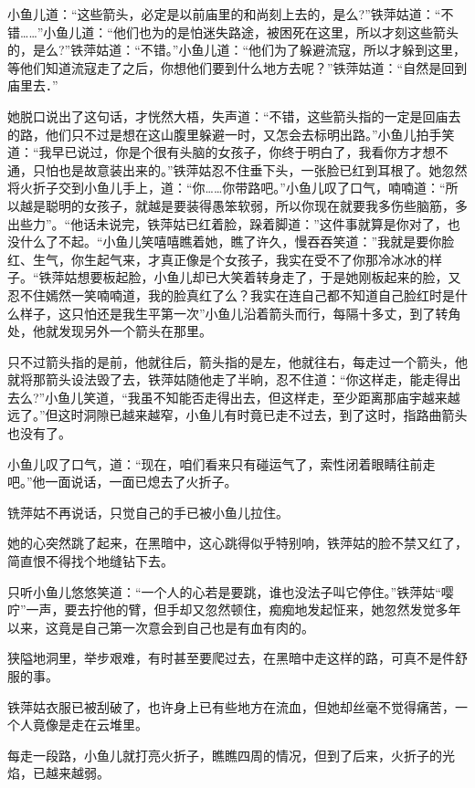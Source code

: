 \documentclass[12pt,oneside]{book}
\begin{document}
小鱼儿道：``这些箭头，必定是以前庙里的和尚刻上去的，是么?''铁萍姑道：``不错\ldots\ldots{}''小鱼儿道：``他们也为的是怕迷失路途，被困死在这里，所以才刻这些箭头的，是么?''铁萍姑道：``不错。''小鱼儿道：``他们为了躲避流寇，所以才躲到这里，等他们知道流寇走了之后，你想他们要到什么地方去呢？''铁萍姑道：``自然是回到庙里去．''

她脱口说出了这句话，才恍然大梧，失声道：``不错，这些箭头指的一定是回庙去的路，他们只不过是想在这山腹里躲避一时，又怎会去标明出路。''小鱼儿拍手笑道：``我早已说过，你是个很有头脑的女孩子，你终于明白了，我看你方才想不通，只怕也是故意装出来的。''铁萍姑忍不住垂下头，一张脸已红到耳根了。她忽然将火折子交到小鱼儿手上，道：``你\ldots\ldots 你带路吧。''小鱼儿叹了口气，喃喃道：``所以越是聪明的女孩子，就越是要装得愚笨软弱，所以你现在就要我多伤些脑筋，多出些力''。``他话未说完，铁萍姑已红着脸，跺着脚道：''这件事就算是你对了，也没什么了不起。``小鱼儿笑嘻嘻瞧着她，瞧了许久，慢吞吞笑道：''我就是要你脸红、生气，你生起气来，才真正像是个女孩子，我实在受不了你那冷冰冰的样子。``铁萍姑想要板起脸，小鱼儿却已大笑着转身走了，于是她刚板起来的脸，又忍不住嫣然一笑喃喃道，我的脸真红了么？我实在连自己都不知道自己脸红时是什么样子，这只怕还是我生平第一次''小鱼儿沿着箭头而行，每隔十多丈，到了转角处，他就发现另外一个箭头在那里。

只不过箭头指的是前，他就往后，箭头指的是左，他就往右，每走过一个箭头，他就将那箭头设法毁了去，铁萍姑随他走了半晌，忍不住道：``你这样走，能走得出去么?''小鱼儿笑道，``我虽不知能否走得出去，但这样走，至少距离那庙宇越来越远了。''但这时洞隙已越来越窄，小鱼儿有时竟已走不过去，到了这时，指路曲箭头也没有了。

小鱼儿叹了口气，道：``现在，咱们看来只有碰运气了，索性闭着眼睛往前走吧。''他一面说话，一面已熄去了火折子。

铣萍姑不再说话，只觉自己的手已被小鱼儿拉住。

她的心突然跳了起来，在黑暗中，这心跳得似乎特别响，铁萍姑的脸不禁又红了，简直恨不得找个地缝钻下去。

只听小鱼儿悠悠笑道：``一个人的心若是要跳，谁也没法子叫它停住。''铁萍姑``嘤咛''一声，要去拧他的臂，但手却又忽然顿住，痴痴地发起怔来，她忽然发觉多年以来，这竟是自己第一次意会到自己也是有血有肉的。

狭隘地洞里，举步艰难，有时甚至要爬过去，在黑暗中走这样的路，可真不是件舒服的事。

铁萍姑衣服已被刮破了，也许身上已有些地方在流血，但她却丝毫不觉得痛苦，一个人竟像是走在云堆里。

每走一段路，小鱼儿就打亮火折子，瞧瞧四周的情况，但到了后来，火折子的光焰，已越来越弱。
\end{document}
